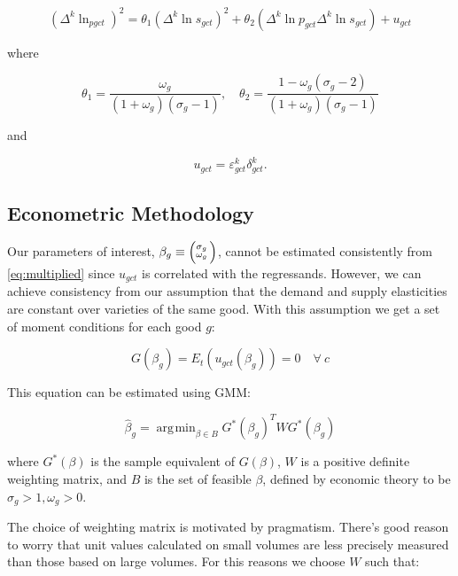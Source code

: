 \documentclass[12pt,a4paper]{article}                      %
\DeclareMathOperator*{\argmin}{arg\!\min}
\begin{document}
\begin{equation}
    (\Delta^k \ln_{pgct})^2 = \theta_1 (\Delta^k \ln s_{gct})^2 + \theta_2 (\Delta^k \ln{p_{gct}} \Delta^k\ln{s_{gct}}) + u_{gct}
\end{equation}

where

\begin{equation}\label{eq:multiplied}
    \theta_1 = \frac{\omega_g}{(1 + \omega_g) (\sigma_g - 1)}, \quad \theta_2 = \frac{1 - \omega_g(\sigma_g - 2)}{(1 + \omega_g)(\sigma_g - 1)}
\end{equation}

and

\begin{equation}
    u_{gct} = \varepsilon^k_{gct} \delta^k_{gct}.
\end{equation}

\subsection{Econometric Methodology}
\label{sub:econometric_methodology}


Our parameters of interest, $\beta_g \equiv \Bigl(\negthinspace\begin{smallmatrix}\sigma_g\\\omega_g\end{smallmatrix}\Bigr)$, cannot be estimated consistently from \ref{eq:multiplied} since $u_{gct}$ is correlated with the regressands.  However, we can achieve consistency from our assumption that the demand and supply elasticities are constant over varieties of the same good.  With this assumption we get a set of moment conditions for each good $g$:

\begin{equation}
    G(\beta_g) = E_t(u_{gct}(\beta_g)) = 0 \quad \forall \ c
\end{equation}

This equation can be estimated using GMM:

\begin{equation}
    \hat{\beta}_g = \argmin_{\beta \in B} G^*(\beta_g)^{T} W G^*(\beta_g)
\end{equation}

where $G^*(\beta)$ is the sample equivalent of $G(\beta)$, $W$ is a positive definite weighting matrix, and $B$ is the set of feasible $\beta$, defined by economic theory to be $\sigma_g > 1, \omega_g > 0$.

The choice of weighting matrix is motivated by pragmatism.  There's good reason to worry that unit values calculated on small volumes are less precisely measured than those based on large volumes.  For this reasons we choose $W$ such that:
\end{document}
